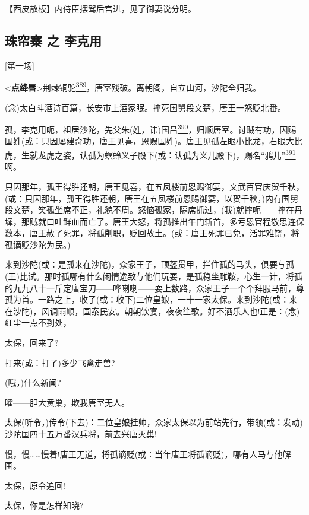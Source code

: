 【西皮散板】内侍臣摆驾后宫进，见了御妻说分明。

\newpage
\hypertarget{ux73e0ux5e18ux5be8-ux4e4b-ux674eux514bux7528}{%
\subsection{珠帘寨 之
李克用}\label{ux73e0ux5e18ux5be8-ux4e4b-ux674eux514bux7528}}

{[}第一场{]}

\textless{}\textbf{点绛唇}\textgreater{}荆棘铜驼\protect\hyperlink{fn389}{\textsuperscript{389}}，唐室残破。离朝阁，自立山河，沙陀全归我。

(念)太白斗酒诗百篇，长安市上酒家眠。摔死国舅段文楚，唐王一怒贬北番。

孤，李克用呃，祖居沙陀，先父朱(姓，讳)国昌\protect\hyperlink{fn390}{\textsuperscript{390}}，归顺唐室。讨贼有功，因赐国姓(或：只因屡建奇功，唐王见喜，恩赐国姓)。唐王见孤左眼小比龙，右眼大比虎，生就龙虎之姿，认孤为螟蛉义子殿下(或：认孤为义儿殿下)，赐名``鸦儿''\protect\hyperlink{fn391}{\textsuperscript{391}}啊。

只因那年，孤王得胜还朝，唐王见喜，在五凤楼前恩赐御宴，文武百官庆贺千秋，(或：只因那年，孤王得胜还朝，唐王在五凤楼前恩赐御宴，以贺千秋，)内有国舅段文楚，笑孤坐席不正，礼貌不周。怒恼孤家，隔席抓过，(我)就摔呃------摔在丹墀，那贼就口吐鲜血而亡了。唐王大怒，将孤推出午门斩首，多亏恩官程敬思连保数本，唐王赦了死罪，将孤削职，贬回故土。(或：唐王死罪已免，活罪难饶，将孤谪贬沙陀为民。)

来到沙陀(或：是孤来在沙陀)，众家王子，顶盔贯甲，拦住孤的马头，俱要与孤(王)比试。那时孤哪有什么闲情逸致与他们玩耍，是孤稳坐雕鞍，心生一计，将孤的九九八十一斤定唐宝刀------哗喇喇------耍上数路，众家王子一个个拜服马前，尊孤为首。一路之上，收了(或：收下)二位皇娘，一十一家太保。来到沙陀(或：来在沙陀)，风调雨顺，国泰民安。朝朝饮宴，夜夜笙歌。好不洒乐人也!正是：(念)红尘一点不到处，

太保，回来了?

打来(或：打了)多少飞禽走兽?

(哦，)什么新闻?

嚯------胆大黄巢，欺我唐室无人。

太保(听令，)传令(下去)：二位皇娘挂帅，众家太保以为前站先行，带领(或：发动)沙陀国四十五万番汉兵将，前去兴唐灭巢!

慢，慢\ldots{}\ldots{}慢着!唐王无道，将孤谪贬(或：当年唐王将孤谪贬)，哪有人马与他解围。

太保，原令追回!

太保，你是怎样知晓?

